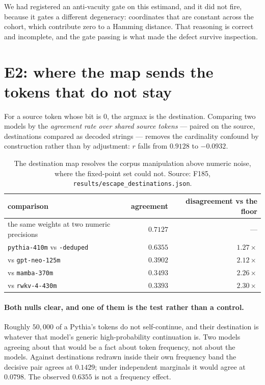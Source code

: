 \documentclass[11pt]{article}
\begin{document}
We had registered an anti-vacuity gate on this estimand, and it did not fire, because it gates a
different degeneracy: coordinates that are constant across the cohort, which contribute zero to a
Hamming distance. That reasoning is correct and incomplete, and the gate passing is what made the
defect survive inspection.

\section{E2: where the map sends the tokens that do not stay}\label{sec:e2}

For a source token whose bit is $0$, the argmax is the destination. Comparing two models by the
\emph{agreement rate over shared source tokens} --- paired on the source, destinations compared as
decoded strings --- removes the cardinality confound by construction rather than by adjustment:
$r$ falls from $0.9128$ to $-0.0932$.

\begin{table}[t]\centering\small
\begin{tabular}{lrr}
\toprule
comparison & agreement & disagreement vs the floor \\
\midrule
the same weights at two numeric precisions & $0.7127$ & --- \\
\texttt{pythia-410m} vs \texttt{-deduped} & $0.6355$ & $1.27\times$ \\
vs \texttt{gpt-neo-125m} & $0.3902$ & $2.12\times$ \\
vs \texttt{mamba-370m} & $0.3493$ & $2.26\times$ \\
vs \texttt{rwkv-4-430m} & $0.3393$ & $2.30\times$ \\
\bottomrule
\end{tabular}
\caption{The destination map resolves the corpus manipulation above numeric noise, where the fixed-point
set could not. Source: F185, \texttt{results/escape\_destinations.json}.}
\label{tab:e2}
\end{table}

\paragraph{Both nulls clear, and one of them is the test rather than a control.} Roughly $50{,}000$ of
a Pythia's tokens do not self-continue, and their destination is whatever that model's generic
high-probability continuation is. Two models agreeing about that would be a fact about token
frequency, not about the models. Against destinations redrawn inside their own frequency band the
decisive pair agrees at $0.1429$; under independent marginals it would agree at $0.0798$. The
observed $0.6355$ is not a frequency effect.
\end{document}
